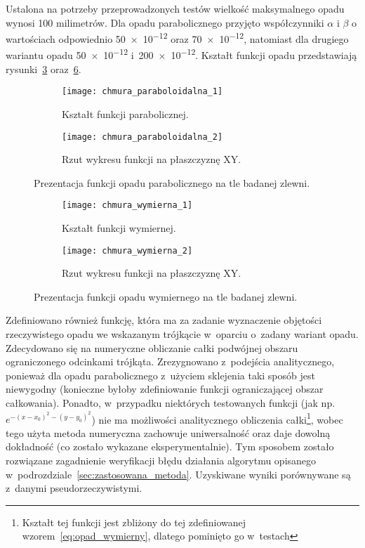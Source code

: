 Ustalona na potrzeby przeprowadzonych testów wielkość maksymalnego opadu wynosi 100 milimetrów. Dla opadu parabolicznego przyjęto współczynniki $\alpha$ i $\beta$ o wartościach odpowiednio \num{50e-12} oraz \num{70e-12}, natomiast dla drugiego wariantu opadu \num{50e-12} i~\num{200e-12}. Kształt funkcji opadu przedstawiają rysunki~\ref{fig:opad_paraboliczny} oraz~\ref{fig:opad_wymierny}. 

\begin{figure}[!ht]
\centering
	\begin{subfigure}{1\textwidth}
		\centering
		\texttt{[image: chmura\_paraboloidalna\_1]}
		\caption{Kształt funkcji parabolicznej.}
		\label{fig:parabola_3d}
	\end{subfigure}	
	\begin{subfigure}{1\textwidth}
		\centering
		\texttt{[image: chmura\_paraboloidalna\_2]}
		\caption{Rzut wykresu funkcji na płaszczyznę XY.}
		\label{fig:parabola_2d}
	\end{subfigure}	
\caption{Prezentacja funkcji opadu parabolicznego na tle badanej zlewni.}
\label{fig:opad_paraboliczny}
\end{figure}

\begin{figure}[!ht]
	\begin{subfigure}{1\textwidth}
		\centering
		\texttt{[image: chmura\_wymierna\_1]}
		\caption{Kształt funkcji wymiernej.}
		\label{fig:wymierna_3d}
	\end{subfigure}	
	\begin{subfigure}{1\textwidth}
		\centering
		\texttt{[image: chmura\_wymierna\_2]}
		\caption{Rzut wykresu funkcji na płaszczyznę XY.}
		\label{fig:wymierna_2d}
	\end{subfigure}	
\caption{Prezentacja funkcji opadu wymiernego na tle badanej zlewni.}
\label{fig:opad_wymierny}
\end{figure}

Zdefiniowano również funkcję, która ma za zadanie wyznaczenie objętości rzeczywistego opadu we wskazanym trójkącie w~oparciu o~zadany wariant opadu. Zdecydowano się na numeryczne obliczanie całki podwójnej obszaru ograniczonego odcinkami trójkąta. Zrezygnowano z~podejścia analitycznego, ponieważ dla opadu parabolicznego z~użyciem sklejenia taki sposób jest niewygodny (konieczne byłoby zdefiniowanie funkcji ograniczającej obszar całkowania). Ponadto, w~przypadku niektórych testowanych funkcji (jak np. $e^{-(x-x_0)^2 - (y-y_0)^2}$) nie ma możliwości analitycznego obliczenia całki\footnote{Kształt tej funkcji jest zbliżony do tej zdefiniowanej wzorem~\ref{eq:opad_wymierny}, dlatego pominięto go w~testach}, wobec tego użyta metoda numeryczna zachowuje uniwersalność oraz daje dowolną dokładność (co zostało wykazane eksperymentalnie). Tym sposobem zostało rozwiązane zagadnienie weryfikacji błędu działania algorytmu opisanego w~podrozdziale~\ref{sec:zastosowana_metoda}. Uzyskiwane wyniki porównywane są z~danymi pseudorzeczywistymi.



